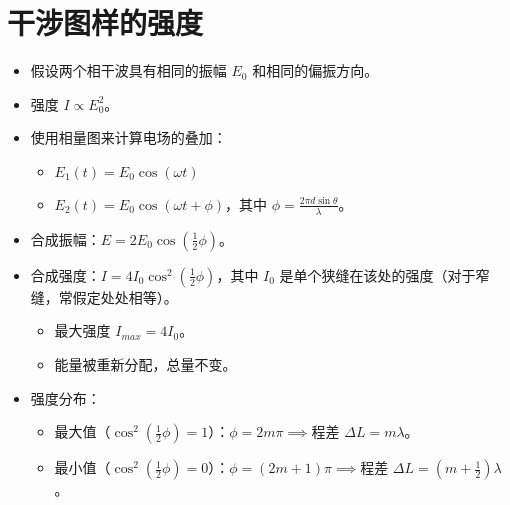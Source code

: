 \documentclass[UTF8]{ctexart}
\begin{document}
\section{干涉图样的强度}
\begin{itemize}
    \item 假设两个相干波具有相同的振幅 $E_0$ 和相同的偏振方向。
    \item 强度 $I \propto E_0^2$。
    \item 使用相量图来计算电场的叠加：
        \begin{itemize}
            \item $E_1(t) = E_0 \cos(\omega t)$
            \item $E_2(t) = E_0 \cos(\omega t + \phi)$，其中 $\phi = \frac{2\pi d \sin\theta}{\lambda}$。
        \end{itemize}
    \item 合成振幅：$E = 2E_0 \cos(\frac{1}{2}\phi)$。
    \item 合成强度：$I = 4I_0 \cos^2(\frac{1}{2}\phi)$，其中 $I_0$ 是单个狭缝在该处的强度（对于窄缝，常假定处处相等）。
        \begin{itemize}
            \item 最大强度 $I_{max} = 4I_0$。
            \item 能量被重新分配，总量不变。
        \end{itemize}
    \item 强度分布：
        \begin{itemize}
            \item 最大值（$\cos^2(\frac{1}{2}\phi) = 1$）：$\phi = 2m\pi \implies \text{程差 } \Delta L = m\lambda$。
            \item 最小值（$\cos^2(\frac{1}{2}\phi) = 0$）：$\phi = (2m+1)\pi \implies \text{程差 } \Delta L = (m+\frac{1}{2})\lambda$。
        \end{itemize}
\end{itemize}
\end{document}
